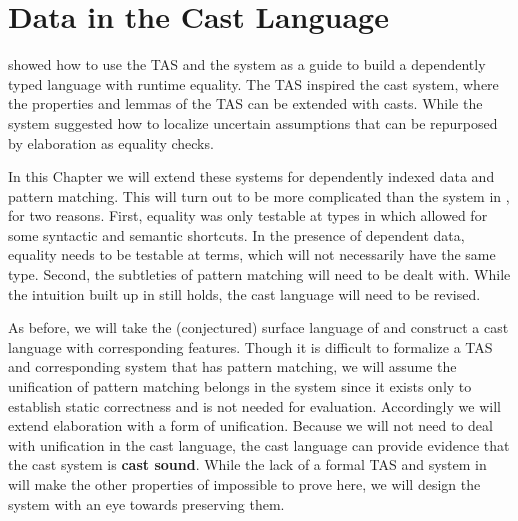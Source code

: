 \chapter{Data in the Cast Language}
\label{chapter:CastData}
\thispagestyle{myheadings}
 
 showed how to use the \ac{TAS} and the \bidir{} system as a guide to build a dependently typed language with runtime equality.
The \ac{TAS} inspired the cast system, where the properties and lemmas of the \ac{TAS} can be extended with casts.
While the \bidir{} system suggested how to localize uncertain assumptions that can be repurposed by elaboration as equality checks.
 
In this Chapter we will extend these systems for dependently indexed data and pattern matching.
This will turn out to be more complicated than the system in , for two reasons.
First, equality was only testable at types in  which allowed for some syntactic and semantic shortcuts.
In the presence of dependent data, equality needs to be testable at terms, which will not necessarily have the same type.
Second, the subtleties of pattern matching will need to be dealt with.
While the intuition built up in  still holds, the cast language will need to be revised.

As before, we will take the (conjectured) surface language of  and construct a cast language with corresponding features.
Though it is difficult to formalize a \ac{TAS} and corresponding \bidir{} system that has pattern matching, we will assume the unification of pattern matching belongs in the \bidir{} system since it exists only to establish static correctness and is not needed for evaluation.
Accordingly we will extend elaboration with a form of unification.
Because we will not need to deal with unification in the cast language, the cast language can provide evidence that the cast system is \textbf{cast sound}. 
While the lack of a formal \ac{TAS} and \bidir{} system in  will make the other properties of  impossible to prove here, we will design the system with an eye towards preserving them.


